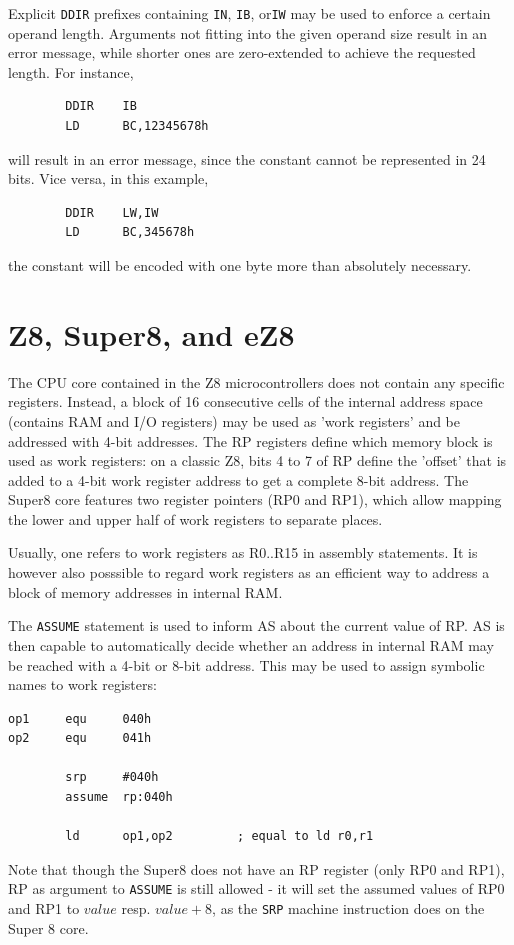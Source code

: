\documentclass[12pt,twoside]{report}
\newcommand{\tty}[1]{{\tt #1}}
\newcommand{\asname}{{AS}}
\begin{document}
Explicit \tty{DDIR} prefixes containing \tty{IN}, \tty{IB}, or\tty{IW}
may be used to enforce a certain operand length.  Arguments not fitting
into the given operand size result in an error message, while shorter
ones are zero-extended to achieve the requested length.  For instance,
\begin{verbatim}
        DDIR    IB
        LD      BC,12345678h
\end{verbatim}
will result in an error message, since the constant cannot be represented
in 24 bits.  Vice versa, in this example,
\begin{verbatim}
        DDIR    LW,IW
        LD      BC,345678h
\end{verbatim}
the constant will be encoded with one byte more than absolutely
necessary.


\section{Z8, Super8, and eZ8}
\label{Z8Spec}

The CPU core contained in the Z8 microcontrollers does not
contain any specific registers.  Instead, a block of 16
consecutive cells of the internal address space (contains RAM and
I/O registers) may be used as 'work registers' and be addressed
with 4-bit addresses.  The RP registers define which memory block
is used as work registers: on a classic Z8, bits 4 to 7 of RP
define the 'offset' that is added to a 4-bit work register
address to get a complete 8-bit address.  The Super8 core
features two register pointers (RP0 and RP1), which allow mapping
the lower and upper half of work registers to separate places.

Usually, one refers to work registers as R0..R15 in assembly
statements.  It is however also posssible to regard work registers as
an efficient way to address a block of memory addresses in internal
RAM.

The \tty{ASSUME} statement is used to inform \asname{} about the current
value of RP. \asname{} is then capable to automatically decide whether an
address in internal RAM may be reached with a 4-bit or 8-bit address.
This may be used to assign symbolic names to work registers:
\begin{verbatim}
op1     equ     040h
op2     equ     041h

        srp     #040h
        assume  rp:040h

        ld      op1,op2         ; equal to ld r0,r1
\end{verbatim}
Note that though the Super8 does not have an RP register (only
RP0 and RP1), RP as argument to \tty{ASSUME} is still allowed -
it will set the assumed values of RP0 and RP1 to $value$ resp.
$value+8$, as the \tty{SRP} machine instruction does on the Super
8 core.
\end{document}
